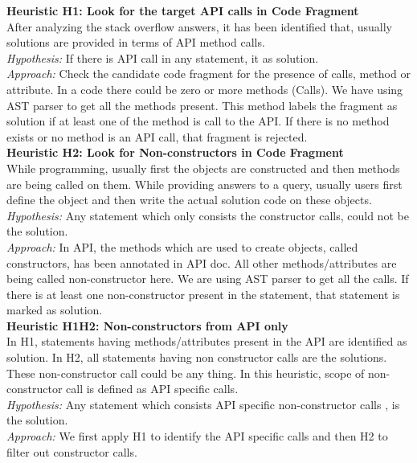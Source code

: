 
\textbf{Heuristic H1: Look for the target API calls in Code Fragment}\\

After analyzing the stack overflow answers, it has been identified that, usually solutions are provided in terms of API method calls.\\
\textit{Hypothesis:} If there is API call in any statement, it as solution.\\
\textit{Approach:} Check the candidate code fragment for the presence of calls, method or attribute. In a code there could be zero or more methods (Calls). We have using AST parser to get all the methods present. This method labels the fragment as solution if at least one of the method is call to the API. If there is no method exists or no method is an API call, that fragment is rejected.\\

\textbf{Heuristic H2: Look for Non-constructors in Code Fragment}\\

While programming, usually first the objects are constructed and then methods are being called on them. While providing answers to a query, usually users first define the object and then write the actual solution code on these objects.\\
\textit{Hypothesis:} Any statement which only consists the constructor calls, could not be the solution.\\
\textit{Approach:} In API, the methods which are used to create objects, called constructors, has been annotated in API doc. All other methods/attributes are being called non-constructor here. We are using AST parser to get all the calls. If there is at least one non-constructor present in the statement, that statement is marked as solution.\\

\textbf{Heuristic H1H2: Non-constructors from API only}\\

In H1, statements having methods/attributes present in the API are identified as solution. In H2, all statements having non constructor calls are the solutions. These non-constructor call could be any thing. In this heuristic, scope of non-constructor call is defined as API specific calls. \\
\textit{Hypothesis:} Any statement which consists API specific non-constructor calls , is the solution.\\
\textit{Approach:} We first apply H1 to identify the API specific calls and then H2 to filter out constructor calls.\\



